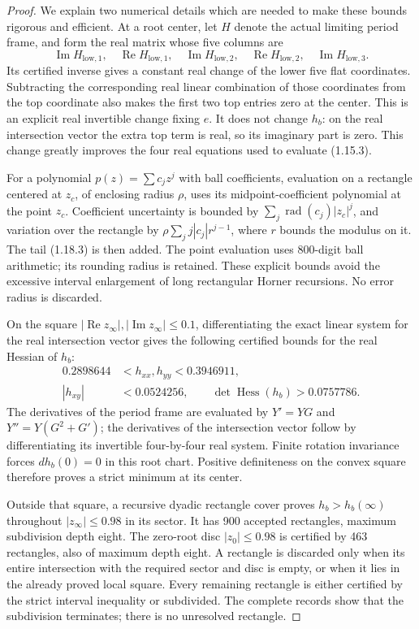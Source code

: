 \begin{proof}
We explain two numerical details which are needed to make these
bounds rigorous and efficient.  At a root center, let $H$ denote
the actual limiting period frame, and form the real matrix whose
five columns are
\[
 \operatorname{Im}H_{\mathrm{low},1},\quad
 \operatorname{Re}H_{\mathrm{low},1},\quad
 \operatorname{Im}H_{\mathrm{low},2},\quad
 \operatorname{Re}H_{\mathrm{low},2},\quad
 \operatorname{Im}H_{\mathrm{low},3}.
\]
Its certified inverse gives a constant real change of the lower five
flat coordinates.  Subtracting the corresponding real linear
combination of those coordinates from the top coordinate also
makes the first two top entries zero at the center.  This is an
explicit real invertible change fixing $e$.  It does not change
$h_b$: on the real intersection vector the extra top term is real,
so its imaginary part is zero.  This change greatly improves the
four real equations used to evaluate (1.15.3).

For a polynomial $p(z)=\sum c_jz^j$ with ball coefficients, evaluation
on a rectangle centered at $z_c$, of enclosing radius $\rho$, uses
its midpoint-coefficient polynomial at the point $z_c$.  Coefficient
uncertainty is bounded by
$\sum_j\operatorname{rad}(c_j)|z_c|^j$, and variation over the
rectangle by
$\rho\sum_j j|c_j|r^{j-1}$, where $r$ bounds the modulus on it.
The tail (1.18.3) is then added.  The point evaluation uses 800-digit
ball arithmetic; its rounding radius is retained.  These explicit
bounds avoid the excessive interval enlargement of long rectangular
Horner recursions.  No error radius is discarded.

On the square $|\operatorname{Re}z_\infty|,
|\operatorname{Im}z_\infty|\leq0.1$, differentiating the exact linear
system for the real intersection vector gives the following
certified bounds for the real Hessian of $h_b$:
\[
\begin{split}
 0.2898644&<h_{xx},h_{yy}<0.3946911,\\
 |h_{xy}|&<0.0524256,\qquad
 \det\operatorname{Hess}(h_b)>0.0757786.
\end{split}
\tag{1.18.5}
\]
The derivatives of the period frame are evaluated by
$Y'=YG$ and $Y''=Y(G^2+G')$; the derivatives of the intersection
vector follow by differentiating its invertible four-by-four real
system.  Finite rotation invariance forces $dh_b(0)=0$ in this
root chart.  Positive definiteness on the convex square therefore
proves a strict minimum at its center.

Outside that square, a recursive dyadic rectangle cover proves
$h_b>h_b(\infty)$ throughout $|z_\infty|\leq0.98$ in its sector.
It has 900 accepted rectangles, maximum subdivision depth eight.
The zero-root disc $|z_0|\leq0.98$ is certified by 463 rectangles,
also of maximum depth eight.  A rectangle is discarded only when
its entire intersection with the required sector and disc is empty,
or when it lies in the already proved local square.  Every remaining
rectangle is either certified by the strict interval inequality or
subdivided.  The complete records show that the subdivision terminates;
there is no unresolved rectangle.


\end{proof}
